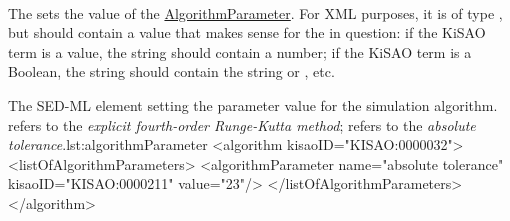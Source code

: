 \paragraph*{}
\label{sec:algorithmParameterValue}
The  sets the value of the \hyperref[class:algorithmParameter]{AlgorithmParameter}.  For XML purposes, it is of type , but should contain a value that makes sense for the  in question:  if the KiSAO term is a value, the string should contain a number; if the KiSAO term is a Boolean, the string should contain the string  or , etc.  

\begin{myXmlLst}{The SED-ML  element setting the parameter value for the simulation algorithm.  refers to the \emph{explicit fourth-order Runge-Kutta method};  refers to the \emph{absolute tolerance}.}{lst:algorithmParameter}
<algorithm kisaoID="KISAO:0000032"> 
	<listOfAlgorithmParameters> 
		<algorithmParameter name="absolute tolerance" kisaoID="KISAO:0000211" value="23"/> 
	</listOfAlgorithmParameters>
</algorithm>
\end{myXmlLst}

